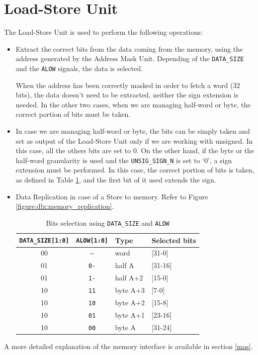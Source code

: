 \section{Load-Store Unit}
\label{sec:ldstr}
The Load-Store Unit is used to perform the following operations:
\begin{itemize}
    \item Extract the correct bits from the data coming from the memory, using the address generated by the Address Mask Unit. Depending of the \texttt{DATA\_SIZE} and the \texttt{ALOW} signals, the data is selected.
    
    When the address has been correctly masked in order to fetch a word (32 bits), the data doesn't need to be extracted, neither the sign extension is needed. In the other two cases, when we are managing half-word or byte, the correct portion of bits must be taken. 

    \item In case we are managing half-word or byte, the bits can be simply taken and set as output of the Load-Store Unit only if we are working with unsigned. In this case, all the others bits are set to 0. On the other hand, if the byte or the half-word granularity is used and the \texttt{UNSIG\_SIGN\_N} is set to `0', a sign extension must be performed. In this case, the correct portion of bits is taken, as defined in Table \ref{tab:addr_selection}, and the first bit of it used extends the sign.

    \item Data Replication in case of a Store to memory. Refer to Figure \ref{figure:dlx:memory_replication}.  


    \begin{table}[H]
        \begin{center}
            \begin{tabular}{ |c| c | l | l|}
                \hline
                \texttt{DATA\_SIZE[1:0]} & \texttt{ALOW[1:0]} & \textbf{Type} & \textbf{Selected bits}\\
                \hline
                00 & \texttt{--} & word & [31-0]\\
                01 & \texttt{0-} & half A & [31-16]\\
                01 & \texttt{1-} & half A+2 & [15-0]\\
                10 & \texttt{11} & byte A+3 & [7-0]\\
                10 & \texttt{10} & byte A+2 & [15-8]\\
                10 & \texttt{01} & byte A+1 & [23-16]\\
                10 & \texttt{00} & byte A & [31-24]\\
                \hline
                
            \end{tabular}
            \caption{Bits selection using \texttt{DATA\_SIZE} and \texttt{ALOW}}
            \label{tab:addr_selection}
        \end{center}
    \end{table}

    
\end{itemize}
A more detailed explanation of the memory interface is available in section \ref{mas}.